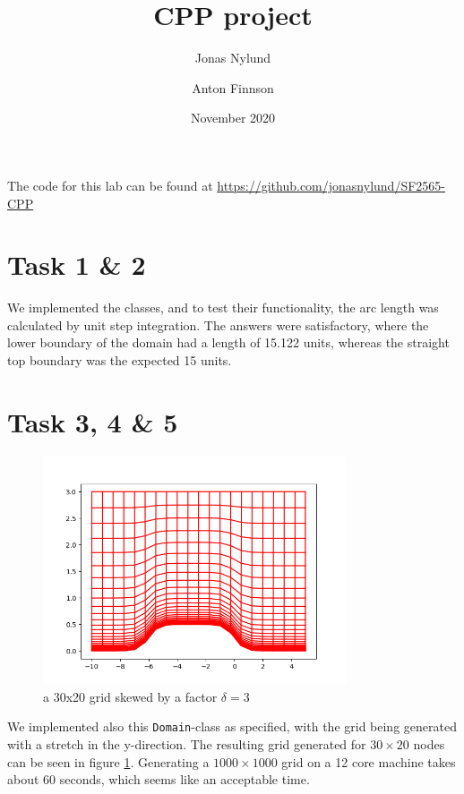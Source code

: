 \documentclass[12pt]{article}
\title{CPP project }
\author{Jonas Nylund \and Anton Finnson}
\date{November 2020}
\begin{document}
\maketitle

The code for this lab can be found at \href{https://github.com/jonasnylund/SF2565-CPP}{https://github.com/jonasnylund/SF2565-CPP}

% 

\section{Task 1 \& 2}
We implemented the classes, and to test their functionality, the arc length was calculated by unit step integration. The answers were satisfactory, where the lower boundary of the domain had a length of 15.122 units, whereas the straight top boundary was the expected 15 units.

\section{Task 3, 4 \& 5}

\begin{figure}[t]
    \centering
    \includegraphics[width=0.8\textwidth]{lab3/Figure_1.png}
    \caption{a 30x20 grid skewed by a factor $\delta=3$}
    \label{fig:grid}
\end{figure}

We implemented also this \texttt{Domain}-class as specified, with the grid being generated with a stretch in the y-direction. The resulting grid generated for $30\times 20$ nodes can be seen in figure \ref{fig:grid}. Generating a $1000\times 1000$ grid on a 12 core machine takes about 60 seconds, which seems like an acceptable time.
\end{document}
